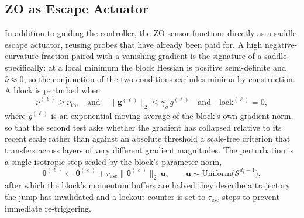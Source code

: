 \documentclass[conference]{IEEEtran}
\begin{document}
\subsection{ZO as Escape Actuator}
\label{subsec:escape}
In addition to guiding the controller, the ZO sensor functions directly as a saddle-escape actuator, reusing probes that have already been paid for. A high negative-curvature fraction paired with a vanishing gradient is the signature of a saddle specifically: at a local minimum the block Hessian is positive semi-definite and $\hat{\nu} \approx 0$, so the conjunction of the two conditions excludes minima by construction. A block is perturbed when
\begin{equation}
\tilde{\nu}^{(\ell)} \ge \nu_{\mathrm{thr}}
\quad\text{and}\quad
\|\mathbf{g}^{(\ell)}\|_2 \le \gamma_g\,\bar{g}^{(\ell)}
\quad\text{and}\quad
\mathrm{lock}^{(\ell)} = 0,
\label{eq:escape_trigger}
\end{equation}
where $\bar{g}^{(\ell)}$ is an exponential moving average of the block's own gradient norm, so that the second test asks whether the gradient has collapsed relative to its recent scale rather than against an absolute threshold a scale-free criterion that transfers across layers of very different gradient magnitudes. The perturbation is a single isotropic step scaled by the block's parameter norm,
\begin{equation}
\boldsymbol{\theta}^{(\ell)} \leftarrow \boldsymbol{\theta}^{(\ell)} + r_{\mathrm{esc}}\|\boldsymbol{\theta}^{(\ell)}\|_2\,\mathbf{u},
\qquad \mathbf{u} \sim \mathrm{Uniform}\bigl(\mathcal{S}^{d_\ell - 1}\bigr),
\label{eq:escape_step}
\end{equation}
after which the block's momentum buffers are halved they describe a trajectory the jump has invalidated and a lockout counter is set to $\tau_{\mathrm{esc}}$ steps to prevent immediate re-triggering.
\end{document}
